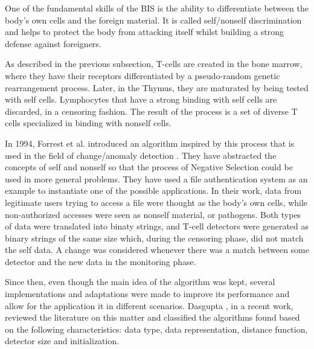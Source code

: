 One of the fundamental skills of the BIS is the ability to differentiate between the body's own cells and the foreign material. It is called self/nonself discrimination \cite{NSAResearch2021} and helps to protect the body from attacking itself whilst building a strong defense against foreigners. 

As described in the previous subsection, T-cells are created in the bone marrow, where they have their receptors differentiated by a pseudo-random genetic rearrangement process. Later, in the Thymus, they are maturated by being tested with self cells. Lymphocytes that have a strong binding with self cells are discarded, in a censoring fashion. The result of the process is a set of diverse T cells specialized in binding with nonself cells.

In 1994, Forrest et al. introduced an algorithm inspired by this process that is used in the field of change/anomaly detection \cite{Forrest1994}. They have abstracted the concepts of self and nonself so that the process of Negative Selection could be used in more general problems. They have used a file authentication system as an example to instantiate one of the possible applications. In their work, data from legitimate users trying to access a file were thought as the body's own cells, while non-authorized accesses were seen as nonself material, or pathogens. Both types of data were translated into binaty strings, and T-cell detectors were generated as binary strings of the same size which, during the censoring phase, did not match the self data. A change was considered whenever there was a match between some detector and the new data in the monitoring phase.

Since then, even though the main idea of the algorithm was kept, several implementations and adaptations were made to improve its performance and allow for the application it in different scenarios. Dasgupta \cite{NSAResearch2021}, in a recent work, reviewed the literature on this matter and classified the algorithms found based on the following characteristics: data type, data representation, distance function, detector size and initialization.

